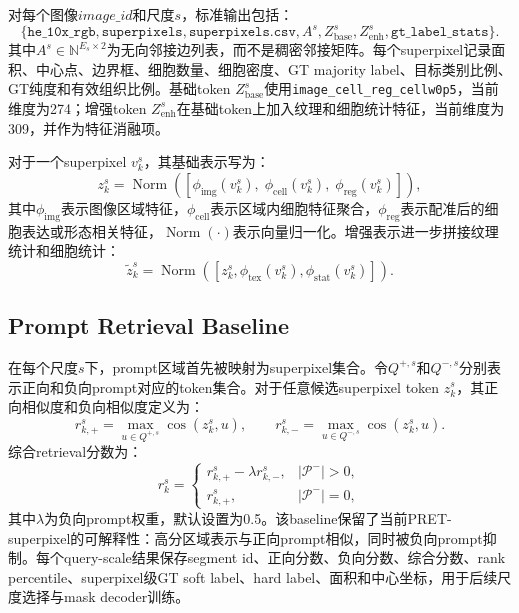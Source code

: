 \documentclass[UTF8]{ctexart}
\begin{document}
对每个图像$image\_id$和尺度$s$，标准输出包括：
\begin{equation}
    \{\texttt{he\_10x\_rgb}, \texttt{superpixels}, \texttt{superpixels.csv},
    A^{s}, Z_{\text{base}}^{s}, Z_{\text{enh}}^{s}, \texttt{gt\_label\_stats}\}.
\end{equation}
其中$A^{s}\in\mathbb{N}^{E_s\times2}$为无向邻接边列表，而不是稠密邻接矩阵。每个superpixel记录面积、中心点、边界框、细胞数量、细胞密度、GT majority label、目标类别比例、GT纯度和有效组织比例。基础token $Z_{\text{base}}^{s}$使用\texttt{image\_cell\_reg\_cellw0p5}，当前维度为274；增强token $Z_{\text{enh}}^{s}$在基础token上加入纹理和细胞统计特征，当前维度为309，并作为特征消融项。

对于一个superpixel $v_k^s$，其基础表示写为：
\begin{equation}
    z_k^s =
    \operatorname{Norm}
    \left(
    [\phi_{\text{img}}(v_k^s),\;
    \phi_{\text{cell}}(v_k^s),\;
    \phi_{\text{reg}}(v_k^s)]
    \right),
\end{equation}
其中$\phi_{\text{img}}$表示图像区域特征，$\phi_{\text{cell}}$表示区域内细胞特征聚合，$\phi_{\text{reg}}$表示配准后的细胞表达或形态相关特征，$\operatorname{Norm}(\cdot)$表示向量归一化。增强表示进一步拼接纹理统计和细胞统计：
\begin{equation}
    \tilde{z}_k^s =
    \operatorname{Norm}
    \left(
    [z_k^s,\phi_{\text{tex}}(v_k^s),\phi_{\text{stat}}(v_k^s)]
    \right).
\end{equation}

\subsection{Prompt Retrieval Baseline}

在每个尺度$s$下，prompt区域首先被映射为superpixel集合。令$Q^{+,s}$和$Q^{-,s}$分别表示正向和负向prompt对应的token集合。对于任意候选superpixel token $z_k^s$，其正向相似度和负向相似度定义为：
\begin{equation}
    r_{k,+}^{s}=\max_{u\in Q^{+,s}}\cos(z_k^s,u),
    \qquad
    r_{k,-}^{s}=\max_{u\in Q^{-,s}}\cos(z_k^s,u).
\end{equation}
综合retrieval分数为：
\begin{equation}
    r_k^{s}=
    \begin{cases}
    r_{k,+}^{s}-\lambda r_{k,-}^{s}, & |\mathcal{P}^{-}|>0,\\
    r_{k,+}^{s}, & |\mathcal{P}^{-}|=0,
    \end{cases}
\end{equation}
其中$\lambda$为负向prompt权重，默认设置为0.5。该baseline保留了当前PRET-superpixel的可解释性：高分区域表示与正向prompt相似，同时被负向prompt抑制。每个query-scale结果保存segment id、正向分数、负向分数、综合分数、rank percentile、superpixel级GT soft label、hard label、面积和中心坐标，用于后续尺度选择与mask decoder训练。
\end{document}
